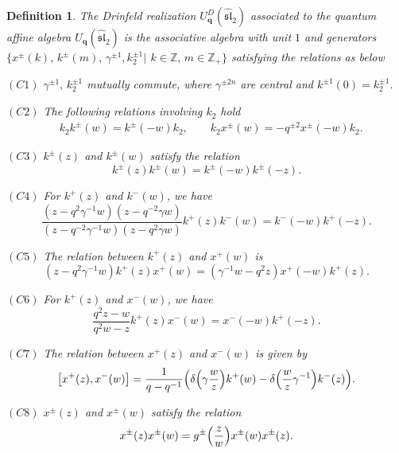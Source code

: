 \documentclass[12pt]{amsart}
\newtheorem{defi}[theorem]{Definition}
\numberwithin{equation}{section}
\numberwithin{equation}{section}
\begin{document}
\begin{defi}  
The Drinfeld realization \(U^{D}_{\textbf{q}}(\widehat{\mathfrak{sl}}_2)\) associated to the quantum affine algebra
\(U_{\textbf{q}}(\widehat{\mathfrak{sl}}_2)\)
is the associative algebra with unit
\(1\) and generators  \(\bigl\{ x^{\pm}(k), \, k^{\pm}(m), \, \gamma^{\pm 1}, k^{\pm 1}_2 \big|\,~k \in
\mathbb{Z}, \, m \in \mathbb{Z}_+\bigr\}\)
satisfying the relations as below

\((C1)\) \(\gamma^{\pm 1},\,k^{\pm1}_2\) mutually commute, where \(\gamma^{\pm 2n}\) are central and \(k^{\pm1}(0)=k^{\pm1}_2\).

\((C2)\) The following relations involving \(k_2\) hold
\begin{align*}
&k_2k^{\pm}(w) = k^{\pm}(-w)k_2, \qquad
k_2x^{\pm}(w) = -q^{\pm 2}x^{\pm}(-w)k_2.
\end{align*}

\((C3)\) \(k^{\pm}(z)\) and \(k^{\pm}(w)\) satisfy the relation
\[
k^{\pm}(z)k^{\pm}(w) = k^{\pm}(-w)k^{\pm}(-z).
\]

\((C4)\) For \(k^+(z)\) and \(k^-(w)\), we have
\[
\dfrac{(z - q^2\gamma^{-1}w)(z - q^{-2}\gamma w)}{(z - q^{-2}\gamma^{-1}w)(z - q^{2}\gamma w)}k^+(z)k^{-}(w) 
= k^-(-w)k^+(-z).
\]

\((C5)\) The relation between \(k^+(z)\) and \(x^{+}(w)\) is
\[
(z - q^2\gamma^{-1}w)k^+(z)x^{+}(w) 
= (\gamma^{-1}w - q^2z)x^{+}(-w)k^+(z).
\]

\((C6)\) For \(k^+(z)\) and \(x^{-}(w)\), we have
\[
\dfrac{q^2z - w}{q^2w - z}k^+(z)x^{-}(w) 
= x^{-}(-w)k^+(-z).
\]

\((C7)\) The relation between \(x^{+}(z)\) and \(x^{-}(w)\) is given by
\[
\bigl[ x^{+}(z), x^{-}(w) \bigr] 
= \frac{1}{q - q^{-1}}\Bigl( \delta\Bigl(\gamma \frac{w}{z}\Bigr)k^+(w) 
- \delta\Bigl(\frac{w}{z}\gamma^{-1}\Bigr)k^{-}(z) \Bigr).
\]

\((C8)\) \(x^{\pm}(z)\) and \(x^{\pm}(w)\) satisfy the relation
\[x^{\pm}(z)x^{\pm}(w) = g^\pm\Bigl(\frac{z}{w}\Bigr)x^{\pm}(w)x^{\pm}(z).\]
\end{defi}
\end{document}
